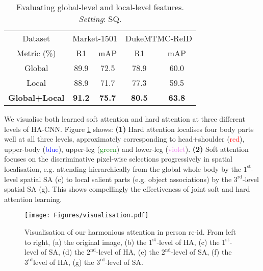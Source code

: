 \documentclass[10pt,twocolumn,letterpaper]{article}
\begin{document}
\vspace{-0.3cm}
\begin{table} [!h]
	\centering
\renewcommand{\arraystretch}{1.2}
	\setlength{\tabcolsep}{0.2 cm}
\caption{Evaluating global-level and local-level features. {\em Setting}: SQ.
	}
	\vskip 1pt \begin{tabular}{|c|cc|cc|}
		\hline
		Dataset &  \multicolumn{2}{c|}{Market-1501} &\multicolumn{2}{c|}{DukeMTMC-ReID} \\ \cline{1-5}
		Metric (\%)    & R1 & mAP & R1 & mAP  \\ \hline \hline
		Global &  89.9 &  72.5  &  78.9 &  60.0\\ Local &  88.9 &  71.7  &  77.3 &  59.5\\ \bf Global+Local & \bf 91.2 & \bf 75.7  & \bf 80.5 & \bf 63.8\\ 
		\hline
	\end{tabular}\label{tab:G_L}
	\vspace{-0.3cm}
\end{table}


\vspace{-0.2cm}
 We visualise both learned soft attention and hard attention at three different levels of HA-CNN. Figure \ref{fig:visa} shows:  {\bf (1)} 
Hard attention localises four body parts well at all three levels,
approximately corresponding to head+shoulder (\textcolor{red}{red}), upper-body (\textcolor{blue}{blue}), upper-leg (\textcolor{green}{green})
and lower-leg (\textcolor{violet}{violet}). {\bf (2)} Soft attention focuses on the discriminative pixel-wise selections progressively in spatial localisation, e.g. attending hierarchically from the global whole body by the $1^{\text{st}}$-level spatial SA (c) to local salient parts (e.g. object associations) by the $3^{\text{rd}}$-level spatial SA (g). This shows compellingly the effectiveness of joint soft and hard attention learning.
\vspace{-0.3cm}
\begin{figure}[!h]
	\centering
	\vspace{-.3cm}
	\texttt{[image: Figures/visualisation.pdf]}
	\vspace{-.3cm}
	\caption{Visualisation of our harmonious attention in person re-id.
		From left to right, (a) the original image, (b) the $1^{\text{st}}$-level
                of HA, (c) the $1^{\text{st}}$-level of SA,
                (d) the $2^{\text{nd}}$-level of HA, 
		(e) the $2^{\text{nd}}$-level of SA,  (f) the $3^{\text{rd}}$level of
                  HA, (g) the $3^{\text{rd}}$-level of SA.
	}
	\label{fig:visa}
	\vspace{0.02cm}
\end{figure}
\end{document}
